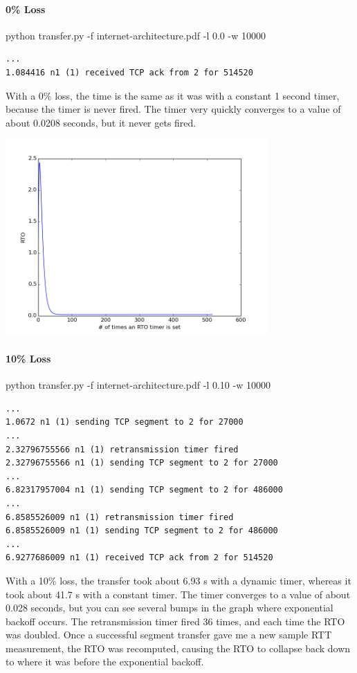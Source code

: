 \documentclass[11pt]{article}
\begin{document}
\paragraph{0\% Loss}
python transfer.py -f internet-architecture.pdf -l 0.0 -w 10000
\begin{lstlisting}
...
1.084416 n1 (1) received TCP ack from 2 for 514520
\end{lstlisting}
With a 0\% loss, the time is the same as it was with a constant 1 second timer, because the timer is never fired. The timer very quickly converges to a value of about 0.0208 seconds, but it never gets fired.

\includegraphics[width=10cm]{../graphs/timeout_0.png}
\pagebreak
\paragraph{10\% Loss}
python transfer.py -f internet-architecture.pdf -l 0.10 -w 10000
\begin{lstlisting}
...
1.0672 n1 (1) sending TCP segment to 2 for 27000
...
2.32796755566 n1 (1) retransmission timer fired
2.32796755566 n1 (1) sending TCP segment to 2 for 27000
...
6.82317957004 n1 (1) sending TCP segment to 2 for 486000
...
6.8585526009 n1 (1) retransmission timer fired
6.8585526009 n1 (1) sending TCP segment to 2 for 486000
...
6.9277686009 n1 (1) received TCP ack from 2 for 514520
\end{lstlisting}
With a 10\% loss, the transfer took about 6.93 s with a dynamic timer, whereas it took about 41.7 s with a constant timer. The timer converges to a value of about 0.028 seconds, but you can see several bumps in the graph where exponential backoff occurs. The retransmission timer fired 36 times, and each time the RTO was doubled. Once a successful segment transfer gave me a new sample RTT measurement, the RTO was recomputed, causing the RTO to collapse back down to where it was before the exponential backoff.
\end{document}
